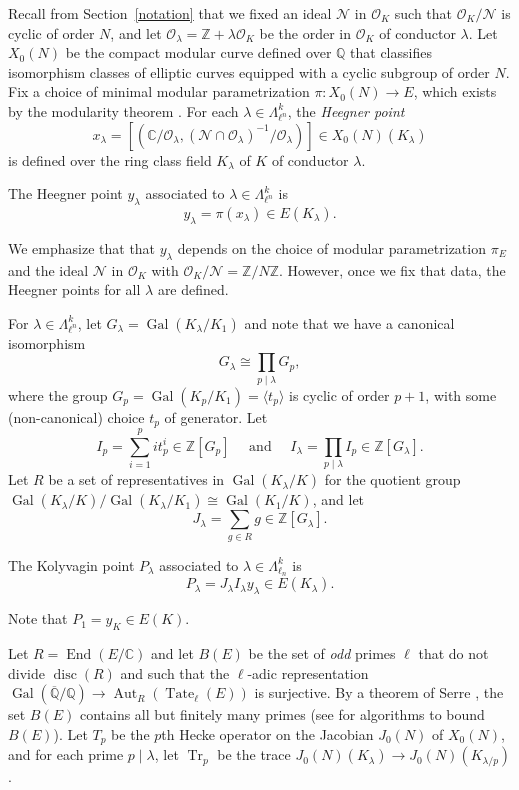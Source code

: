 \documentclass{oupau}
\DeclareMathOperator{\Aut}{Aut}
\DeclareMathOperator{\disc}{disc}
\DeclareMathOperator{\End}{End}
\DeclareMathOperator{\Gal}{Gal}
\DeclareMathOperator{\Tate}{Tate}
\DeclareMathOperator{\Tr}{Tr}
\newcommand{\isom}{\cong}
\newcommand{\CC}{\mathbb{C}}
\newcommand{\cN}{\mathcal{N}}
\newcommand{\OO}{\mathcal{O}}
\newcommand{\QQ}{\mathbb{Q}}
\newcommand{\ZZ}{\mathbb{Z}}
\newcommand{\QQbar}{\overline{\QQ}}
\begin{document}
Recall from Section~\ref{notation} that we fixed an ideal
$\mathcal{N}$ in $\OO_K$ such that $\OO_K/\mathcal{N}$ is cyclic of
order $N$, and let $\OO_{\lambda} = \ZZ + \lambda \OO_K$ be the order
in $\OO_K$ of conductor $\lambda$. 
Let $X_0(N)$ be the compact modular curve defined over $\QQ$ that classifies
isomorphism classes of elliptic curves equipped with a cyclic subgroup
of order $N$. 
Fix a choice of minimal modular parametrization $\pi:X_0(N)\to E$, which
exists by the modularity theorem \cite{breuil-conrad-diamond-taylor, wiles:fermat}.
For each $\lambda \in \Lambda_{\ell^n}^k$, the {\em Heegner point}
$$
  x_{\lambda} = [(\CC/\OO_{\lambda}, (\mathcal{N}\cap\OO_{\lambda})^{-1} / \OO_{\lambda})]
                \in X_0(N)(K_{\lambda})
$$
is defined over the ring class field $K_{\lambda}$ of $K$ of conductor $\lambda$. 
\begin{definition}
The Heegner point $y_{\lambda}$ associated to $\lambda \in \Lambda_{\ell^n}^k$
is 
$$
  y_{\lambda} = \pi(x_{\lambda}) \in E(K_{\lambda}).
$$
\end{definition}
We emphasize that that $y_{\lambda}$ depends on the choice of modular
parametrization $\pi_E$ and the ideal $\cN$ in $\OO_K$ with
$\OO_K/\cN=\ZZ/N\ZZ$.   However, once we fix that data, the Heegner points
for all $\lambda$ are defined. 

For $\lambda \in \Lambda_{\ell^n}^k$, let $ G_{\lambda} = \Gal(K_{\lambda}/K_1) $
and note that we have a canonical isomorphism
$$
 G_{\lambda} \isom \prod_{p \mid \lambda} G_p,
$$
where the group $G_p = \Gal(K_p/K_1) = \langle t_p \rangle$ is cyclic of order $p+1$,
with some (non-canonical) choice $t_p$ of generator.  Let
$$
I_p = \sum_{i=1}^p i t_p^i \in \ZZ[G_p]
\quad\text{ and }\quad
I_{\lambda} = \prod_{p\mid \lambda} I_p \in \ZZ[G_{\lambda}].
$$
Let $R$ be a set of representatives in $\Gal(K_{\lambda}/K)$
for the quotient group
$\Gal(K_{\lambda}/K) / \Gal(K_{\lambda}/K_1) \isom \Gal(K_1/K)$, 
and  let
$$
J_{\lambda} = \sum_{g \in R} g \in \ZZ[G_{\lambda}].
$$
\begin{definition}
The Kolyvagin point $P_{\lambda}$ associated to $\lambda \in \Lambda^k_{\ell_n}$ is
$$
  P_{\lambda} = J_{\lambda} I_{\lambda} y_{\lambda} \in E(K_{\lambda}).
$$
\end{definition}
Note that $P_1 = y_K \in E(K)$. 



Let $R=\End(E/\CC)$ and let $B(E)$\label{defn:be} be the set of {\em odd}
primes $\ell$ that do not divide $\disc(R)$ and such that the
$\ell$-adic representation
$\Gal(\QQbar/\QQ)\to\Aut_{R}(\Tate_{\ell}(E))$ is surjective.  By a
theorem of Serre \cite{serre:propgal}, the set $B(E)$ contains all but
finitely many primes (see \cite{bsdalg1} for algorithms to bound
$B(E)$).  Let $T_p$ be the $p$th Hecke operator on the Jacobian $J_0(N)$
of $X_0(N)$, and for each prime $p\mid \lambda$, let $\Tr_p$ be the
trace $J_0(N)(K_{\lambda}) \to J_0(N)(K_{\lambda/p})$.
\end{document}
